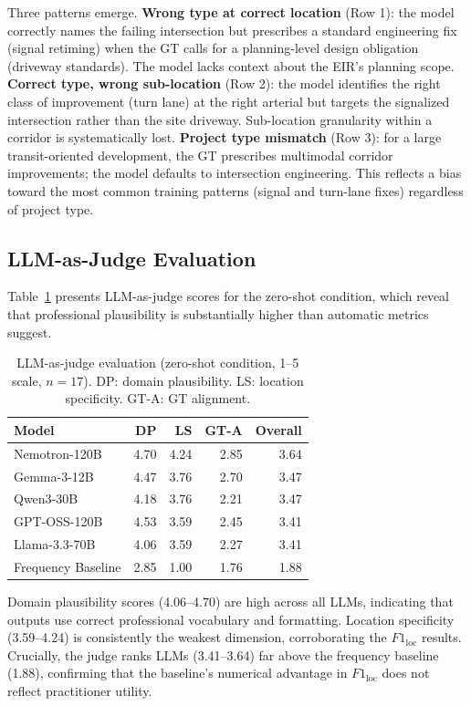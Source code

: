 \documentclass[preprint,12pt]{elsarticle}
\begin{document}
Three patterns emerge.
\textbf{Wrong type at correct location} (Row 1): the model correctly names
the failing intersection but prescribes a standard engineering fix
(signal retiming) when the GT calls for a planning-level design obligation
(driveway standards). The model lacks context about the EIR's planning scope.
\textbf{Correct type, wrong sub-location} (Row 2): the model identifies
the right class of improvement (turn lane) at the right arterial but
targets the signalized intersection rather than the site driveway. Sub-location
granularity within a corridor is systematically lost.
\textbf{Project type mismatch} (Row 3): for a large transit-oriented
development, the GT prescribes multimodal corridor improvements;
the model defaults to intersection engineering. This reflects a bias
toward the most common training patterns (signal and turn-lane fixes)
regardless of project type.

\subsection{LLM-as-Judge Evaluation}

Table~\ref{tab:judge} presents LLM-as-judge scores for the zero-shot condition,
which reveal that professional plausibility is substantially higher than
automatic metrics suggest.

\begin{table}[h]
\centering
\caption{LLM-as-judge evaluation (zero-shot condition, 1--5 scale, $n=17$).
DP: domain plausibility. LS: location specificity. GT-A: GT alignment.}
\label{tab:judge}
\begin{tabular}{lrrrr}
\toprule
Model & DP & LS & GT-A & Overall \\
\midrule
Nemotron-120B      & 4.70 & 4.24 & 2.85 & 3.64 \\
Gemma-3-12B        & 4.47 & 3.76 & 2.70 & 3.47 \\
Qwen3-30B          & 4.18 & 3.76 & 2.21 & 3.47 \\
GPT-OSS-120B       & 4.53 & 3.59 & 2.45 & 3.41 \\
Llama-3.3-70B      & 4.06 & 3.59 & 2.27 & 3.41 \\
Frequency Baseline & 2.85 & 1.00 & 1.76 & 1.88 \\
\bottomrule
\end{tabular}
\end{table}

Domain plausibility scores (4.06--4.70) are high across all LLMs,
indicating that outputs use correct professional vocabulary and formatting.
Location specificity (3.59--4.24) is consistently the weakest dimension,
corroborating the $F1_\text{loc}$ results.
Crucially, the judge ranks LLMs (3.41--3.64) far above the frequency
baseline (1.88), confirming that the baseline's numerical advantage
in $F1_\text{loc}$ does not reflect practitioner utility.
\end{document}
